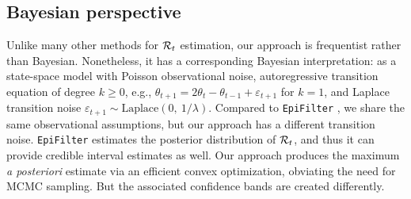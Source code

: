 \subsection{Bayesian perspective}

Unlike many other methods for $\mathcal{R}_t$ estimation, our approach is frequentist
rather than Bayesian. Nonetheless, it has a corresponding Bayesian
interpretation: as a state-space model with Poisson observational noise,
autoregressive transition equation of degree $k\geq 0$, e.g., $\theta_{t+1} =
2\theta_t - \theta_{t-1} + \varepsilon_{t+1}$ for $k=1$, and Laplace transition
noise $\varepsilon_{t+1}\sim \mathrm{Laplace}(0,\ 1/\lambda)$. Compared to
\texttt{EpiFilter} \citep{parag2021improved},
 we share the same observational assumptions, but our approach has a
different transition noise. \texttt{EpiFilter} estimates the posterior
distribution of
$\mathcal{R}_t$, and thus it can provide credible interval estimates as well. Our
approach produces the maximum \emph{a posteriori} estimate via an efficient
convex optimization, obviating the need for MCMC sampling. But the associated
confidence bands are created differently.
